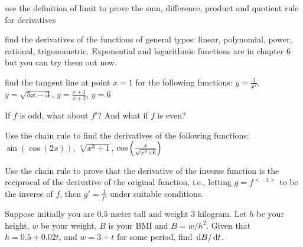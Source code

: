\documentclass[Calculus 1 Recitation.tex]{subfiles}
\begin{document}
\begin{myleftlinebox}
	use the definition of limit to prove the sum, difference, product and quotient rule for derivatives
	\tcblower
	\vspace{3em}
\end{myleftlinebox}

\begin{myleftlinebox}
	find the derivatives of the functions of general types: linear, polynomial, power, rational, trigonometric. Exponential and logarithmic functions are in chapter 6 but you can try them out now.
	\tcblower
	\vspace{3em}
\end{myleftlinebox}

\begin{myleftlinebox}
	find the tangent line at point $x=1$ for the following functions: $y=\frac{3}{x^2}$, $y=\sqrt{5x-3}$, $y=\frac{x+1}{x+2}$, $y=6$
	\tcblower
	\vspace{3em}
\end{myleftlinebox}

\begin{myleftlinebox}
	If $f$ is odd, what about $f'$? And what if $f$ is even?
	\tcblower
	\vspace{2em}
\end{myleftlinebox}

\begin{myleftlinebox}
	Use the chain rule to find the derivatives of the following functions: $\sin(\cos(2x))$, $\sqrt[4]{x^3+1}$, $\cos\left( \frac{x}{\sqrt{x^3+6}} \right)$
	\tcblower
	\vspace{2em}
\end{myleftlinebox}

\begin{myleftlinebox}
	Use the chain rule to prove that the derivative of the inverse function is the reciprocal of the derivative of the original function, i.e., letting $g=f^{<-1>}$ to be the inverse of $f$, then $g'=\frac{1}{f'}$ under suitable conditions.
	\tcblower
	\vspace{2em}
\end{myleftlinebox}

\begin{myleftlinebox}
	Suppose initially you are $0.5$ meter tall and weight $3$ kilogram. Let $h$ be your height, $w$ be your weight, $B$ is your BMI and $B=w/h^2$. Given that $h=0.5+0.02t$, and $w=3+t$ for some period, find $\,\mathrm{d} B/\,\mathrm{d} t$.
	\tcblower
	\vspace{2em}
\end{myleftlinebox}
\end{document}
